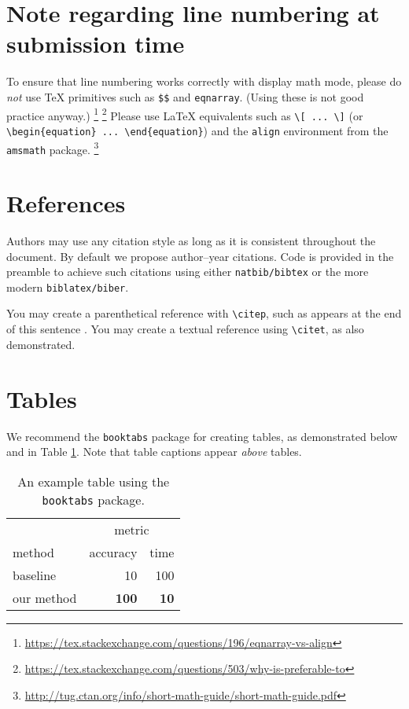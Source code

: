 \documentclass[11pt]{article}
\begin{document}
\section{Note regarding line numbering at submission time}

To ensure that line numbering works correctly with display math mode, please do
\emph{not} use \TeX{} primitives such as \verb|$$| and \texttt{eqnarray}.  (Using
these is not good practice anyway.)%
%
\footnote{\url{https://tex.stackexchange.com/questions/196/eqnarray-vs-align}}%
\footnote{\url{https://tex.stackexchange.com/questions/503/why-is-preferable-to}}
%
Please use \LaTeX{} equivalents such as \verb|\[ ... \]| (or
\verb|\begin{equation} ... \end{equation}|) and the \texttt{align} environment
from the \texttt{amsmath} package.%
%
\footnote{\url{http://tug.ctan.org/info/short-math-guide/short-math-guide.pdf}}

\section{References}

Authors may use any citation style as long as it is consistent throughout the
document. By default we propose author--year citations. Code is provided in the
preamble to achieve such citations using either \texttt{natbib/bibtex} or the
more modern \texttt{biblatex/biber}.

You may create a parenthetical reference with \verb|\citep|, such as appears at
the end of this sentence \citep{example_book}.  You may create a textual
reference using \verb|\citet|, as \citet{example_book} also demonstrated.

\section{Tables}

We recommend the \texttt{booktabs} package for creating tables, as demonstrated
below and in Table \ref{example_table}. Note that table captions appear
\emph{above} tables.

\begin{table}
  \caption{An example table using the \texttt{booktabs} package.}
  \label{example_table}
  \centering
  \begin{tabular}{lrr}
    \toprule
    & \multicolumn{2}{c}{metric} \\
    \cmidrule{2-3}
    method & accuracy & time \\
    \midrule
    baseline & 10 & 100 \\
    our method & \textbf{100} & \textbf{10} \\
    \bottomrule
  \end{tabular}
\end{table}
\end{document}
